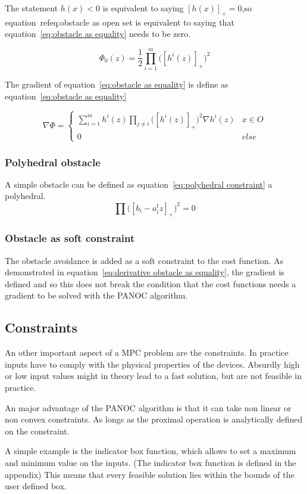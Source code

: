 				The statement $h(x)<0$ is equivalent to saying $[h(x)]_+=0$,so equation~ref{eq:obstacle as open set} is equivalent to saying that equation~\ref{eq:obstacle as equality} needs to be zero.
				
				\begin{equation}
					\Phi_0(z) =  \frac{1}{2} \prod_{i=1}^m \Big( [h^i(z)]_+ \Big)^2
					\label{eq:obstacle as equality}
				\end{equation}
				
				The gradient of equation~\ref{eq:obstacle as equality} is define as equation~\ref{eq:obstacle as equality}
				
				\begin{equation}
					\nabla \Phi =
					\begin{cases}
						\sum_{i=1}^{m} h^i(z)\prod_{j \ne i} \Big( [h^i(z)]_+ \Big)^2 \nabla h^i(z)
						& x \in O \\
						0 & else
					\end{cases}
					\label{eq:derivative obstacle as equality}
				\end{equation}
			
			\subsubsection{Polyhedral obstacle}
				A simple obstacle can be defined as equation~\ref{eq:polyhedral constraint} a polyhedral.
				\begin{equation}
					\prod \Big([b_i - a_i^t z]_+ \Big)^2 = 0
					\label{eq:polyhedral constraint}
				\end{equation}
			
			\subsubsection{Obstacle as soft constraint}
				The obstacle avoidance is added as a soft constraint to the cost function. As demonstrated in equation~\ref{eq:derivative obstacle as equality}, the gradient is defined and so this does not break the condition that the cost functions needs a gradient to be solved with the PANOC algorithm.
			
		\subsection{Constraints}
			An other important aspect of a MPC problem are the constraints. In practice inputs have to comply with the physical properties of the devices. Absurdly high or low input values might in theory lead to a fast solution, but are not feasible in practice.
			
			An major advantage of the PANOC algorithm is that it can take non linear or non convex constraints. As longs as the proximal operation is analytically defined on the constraint. 
			
			A simple example is the indicator box function, which allows to set a maximum and minimum value on the inputs. (The indicator box function is defined in the appendix) This means that every feasible solution lies within the bounds of the user defined box.